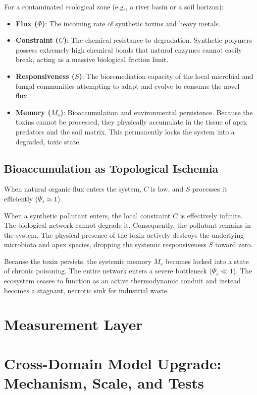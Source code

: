 \documentclass[11pt,a4paper]{article}
\begin{document}
For a contaminated ecological zone (e.g., a river basin or a soil horizon):
\begin{itemize}
    \item \textbf{Flux ($\Phi$)}: The incoming rate of synthetic toxins and heavy metals.
    \item \textbf{Constraint ($C$)}: The chemical resistance to degradation. Synthetic polymers possess extremely high chemical bonds that natural enzymes cannot easily break, acting as a massive biological friction limit.
    \item \textbf{Responsiveness ($S$)}: The bioremediation capacity of the local microbial and fungal communities attempting to adapt and evolve to consume the novel flux.
    \item \textbf{Memory ($M_s$)}: Bioaccumulation and environmental persistence. Because the toxins cannot be processed, they physically accumulate in the tissue of apex predators and the soil matrix. This permanently locks the system into a degraded, toxic state.
\end{itemize}

\subsection{Bioaccumulation as Topological Ischemia}
When natural organic flux enters the system, $C$ is low, and $S$ processes it efficiently ($\Psi_s \approx 1$).

When a synthetic pollutant enters, the local constraint $C$ is effectively infinite. The biological network cannot degrade it. Consequently, the pollutant remains in the system. The physical presence of the toxin actively destroys the underlying microbiota and apex species, dropping the systemic responsiveness $S$ toward zero.

Because the toxin persists, the systemic memory $M_s$ becomes locked into a state of chronic poisoning. The entire network enters a severe bottleneck ($\Psi_s \ll 1$). The ecosystem ceases to function as an active thermodynamic conduit and instead becomes a stagnant, necrotic sink for industrial waste.



\section{Measurement Layer}

\section{Cross-Domain Model Upgrade: Mechanism, Scale, and Tests}
\end{document}
